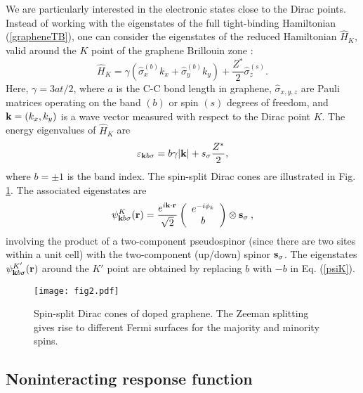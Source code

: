\documentclass[aps,prb,twocolumn,superscriptaddress]{revtex4-2}
\newcommand{\si}{\sigma}
\newcommand{\bfk}{{\bf k}}
\newcommand{\bfr}{{\bf r}}
\newcommand{\bfs}{{\bf s}}
\begin{document}
We are particularly interested in the electronic states close to the Dirac points. Instead of working with
the eigenstates of the full tight-binding Hamiltonian (\ref{grapheneTB}), one can consider the
eigenstates of the reduced Hamiltonian $\hat H_K$, valid around the $K$ point of the graphene Brillouin zone \cite{Neto2009,Ando2006}:
\begin{equation}\label{grapheneKK}
\hat H_{K} =\gamma \left(\hat \si_x^{(b)} k_x + \hat \si_y^{(b)} k_y\right) + \frac{Z^*}{2} \hat \si^{(s)}_z .
\end{equation}
Here, $\gamma = 3at/2$, where $a$ is the C-C bond length in graphene, $\hat \sigma_{x,y,z}$  are Pauli matrices operating on the
band $(b)$ or spin $(s)$ degrees of freedom, and $\bfk = (k_x,k_y)$ is a wave vector measured with respect to the Dirac point $K$.
The energy eigenvalues of $\hat H_K$ are
\begin{equation}\label{eq:GrapheneEnergySpin}
  \varepsilon_{\bfk b\si} = b\gamma |\bfk| + s_\si \frac{Z^*}{2},
\end{equation}
where $b=\pm 1$ is the band index. The spin-split Dirac cones are illustrated in Fig. \ref{fig:GrapheneStructure}.
The associated eigenstates are
\begin{equation}\label{psiK}
  \psi_{\bfk b\si}^K (\bfr) = \frac{e^{i \bfk \cdot \bfr}}{\sqrt{2}} \left( \begin{array}{c}
    e^{-i \phi_k} \\ b
  \end{array} \right)  \otimes \bfs_\si \:,
\end{equation}
involving the product of a two-component pseudospinor (since there are two sites within a unit cell)
with the two-component (up/down) spinor $\bfs_\si$. The eigenstates $\psi_{\bfk b\si}^{K'} (\bfr)$
around the $K'$ point are obtained by replacing $b$ with $-b$ in Eq. (\ref{psiK}).



\begin{figure}
  \begin{center}
    \texttt{[image: fig2.pdf]}
    \caption{\small Spin-split Dirac cones of doped graphene. The Zeeman splitting gives rise to
    different Fermi surfaces for the majority and minority spins.}
    \label{fig:GrapheneStructure}
  \end{center}
\end{figure}


\subsection{Noninteracting response function}\label{sec3B}
\end{document}
